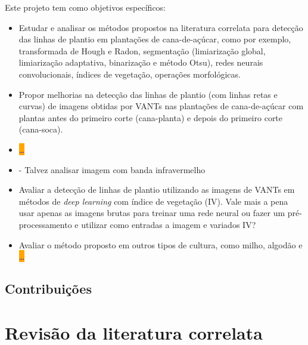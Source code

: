 \documentclass[12pt, a4paper, english, brazil]{article}
\newcommand{\textRed}[1]{{{\color{red} #1}}}
\newcommand{\dotsBlue}{\colorbox{orange}{\textcolor{blue}{\dots}}}
\begin{document}
Este projeto tem como objetivos específicos:
\begin{itemize}
    \item Estudar e analisar os métodos propostos na literatura correlata para detecção das linhas de plantio em plantações de cana-de-açúcar, como por exemplo, transformada de Hough e Radon, segmentação (limiarização global, limiarização adaptativa, binarização e método Otsu), redes neurais convolucionais, índices de vegetação, operações morfológicas.

    \item Propor melhorias na detecção das linhas de plantio (com linhas retas e curvas) de imagens obtidas por VANTs nas plantações de cana-de-açúcar com plantas antes do primeiro corte (cana-planta) e depois do primeiro corte (cana-soca).

    \item \dotsBlue

    \item - \textRed{Talvez analisar imagem com banda infravermelho}

    \item Avaliar a detecção de linhas de plantio utilizando as imagens de VANTs em métodos de \textit{deep learning} com índice de vegetação (IV). Vale mais a pena usar apenas as imagens brutas para treinar uma rede neural ou fazer um pré-processamento e utilizar como entradas a imagem e variados IV?

    \item Avaliar o método proposto em outros tipos de cultura, como milho, algodão e \dotsBlue
\end{itemize}


\subsection{Contribuições}

\section{Revisão da literatura correlata}
\end{document}
